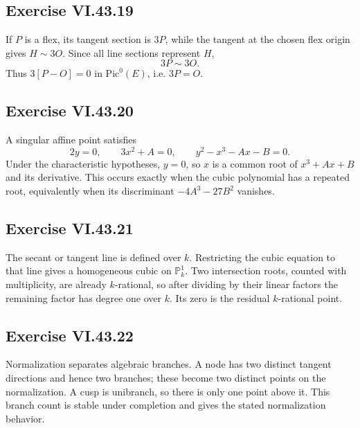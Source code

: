 \subsection*{Exercise VI.43.19}
\begin{solution}
If \(P\) is a flex, its tangent section is \(3P\), while the tangent at the chosen flex origin gives \(H\sim3O\).  Since all line sections represent \(H\),
\[
3P\sim3O.
\]
Thus \(3[P-O]=0\) in \(\mathrm{Pic}^0(E)\), i.e. \(3P=O\).
\end{solution}

\subsection*{Exercise VI.43.20}
\begin{solution}
A singular affine point satisfies
\[
2y=0,\qquad 3x^2+A=0,\qquad y^2-x^3-Ax-B=0.
\]
Under the characteristic hypotheses, \(y=0\), so \(x\) is a common root of \(x^3+Ax+B\) and its derivative.  This occurs exactly when the cubic polynomial has a repeated root, equivalently when its discriminant \(-4A^3-27B^2\) vanishes.
\end{solution}

\subsection*{Exercise VI.43.21}
\begin{solution}
The secant or tangent line is defined over \(k\).  Restricting the cubic equation to that line gives a homogeneous cubic on \(\mathbb P^1_k\).  Two intersection roots, counted with multiplicity, are already \(k\)-rational, so after dividing by their linear factors the remaining factor has degree one over \(k\).  Its zero is the residual \(k\)-rational point.
\end{solution}

\subsection*{Exercise VI.43.22}
\begin{solution}
Normalization separates algebraic branches.  A node has two distinct tangent directions and hence two branches; these become two distinct points on the normalization.  A cusp is unibranch, so there is only one point above it.  This branch count is stable under completion and gives the stated normalization behavior.
\end{solution}

